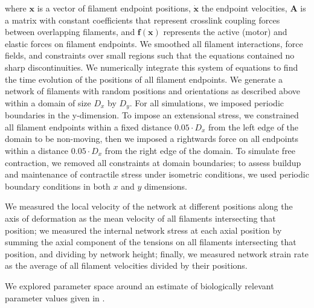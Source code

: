 \documentclass[10pt,letterpaper]{article}
\begin{document}
where $\mathbf{x}$ is a vector of filament endpoint positions, $\mathbf{\dot{x}}$ the endpoint velocities, $\mathbf{A }$ is a matrix with constant coefficients that represent crosslink coupling forces between overlapping filaments, and $\mathbf{f(x)}$ represents the active (motor) and elastic forces on filament endpoints. We smoothed all filament interactions, force fields, and constraints over small regions such that the equations contained no sharp discontinuities. We numerically integrate this system of equations to find the time evolution of the positions of all filament endpoints. We generate a network of filaments with random positions and orientations as described above within a domain of size $D_x$ by $D_y$.  For all simulations, we imposed periodic boundaries in the y-dimension. To impose an extensional stress, we constrained all filament endpoints within a fixed distance $0.05\cdot D_x$ from the left edge of the domain to be non-moving, then we imposed a rightwards force on all endpoints within a distance $0.05\cdot D_x$ from the right edge of the domain.   To simulate free contraction, we removed all constraints at domain boundaries; to assess buildup and maintenance of contractile stress under isometric conditions, we used periodic boundary conditions in both $x$ and $y$ dimensions.

We measured the local velocity of the network at different positions along the axis of deformation as the mean velocity of all filaments intersecting that position; we measured the internal network stress at each axial position by summing the axial component of the tensions on all filaments intersecting that position, and dividing by network height; finally, we measured network strain rate as the average of all filament velocities divided by their positions.

We explored parameter space around an estimate of biologically relevant parameter values given in . 
\end{document}
